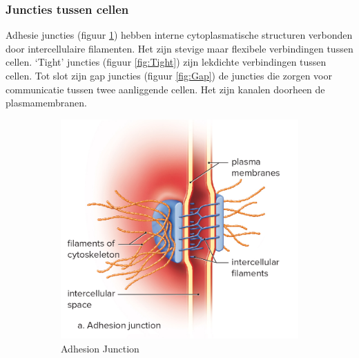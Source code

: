 \documentclass[a4paper,kul]{kulakarticle} %
\begin{document}
\subsubsection{Juncties tussen cellen}
Adhesie juncties (figuur \ref{fig:Adhesie}) hebben interne cytoplasmatische structuren verbonden door intercellulaire filamenten. Het zijn stevige maar flexibele verbindingen tussen cellen. `Tight' juncties (figuur \ref{fig:Tight}) zijn lekdichte verbindingen tussen cellen. Tot slot zijn gap juncties (figuur \ref{fig:Gap}) de juncties die zorgen voor communicatie tussen twee aanliggende cellen. Het zijn kanalen doorheen de plasmamembranen.   

\begin{figure}[h]
	\centering
	\begin{subfigure}{.33\textwidth}
		\centering
		\includegraphics[width=1\linewidth]{Adhesie_Junctie}
		\caption{Adhesion Junction}
		\label{fig:Adhesie}
	\end{subfigure}%
	\begin{subfigure}{.33\textwidth}
		\centering

\end{subfigure}
\end{figure}
\end{document}
